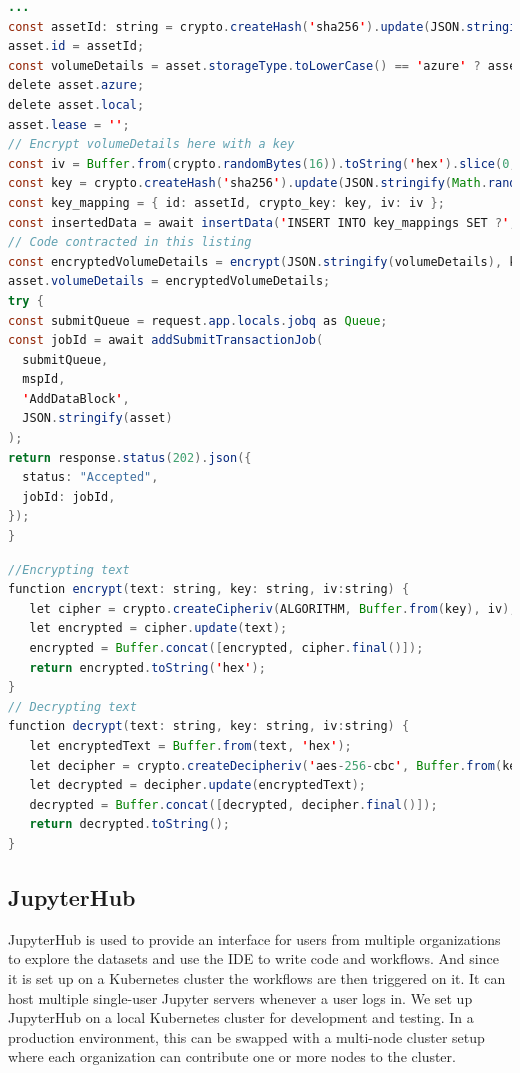 \begin{lstlisting}[language=java, caption={Endpoint to create a block in the chain}]
...
const assetId: string = crypto.createHash('sha256').update(JSON.stringify(asset)).digest('hex');
asset.id = assetId;
const volumeDetails = asset.storageType.toLowerCase() == 'azure' ? asset.azure : asset.local;
delete asset.azure;
delete asset.local;
asset.lease = '';
// Encrypt volumeDetails here with a key
const iv = Buffer.from(crypto.randomBytes(16)).toString('hex').slice(0, 16);
const key = crypto.createHash('sha256').update(JSON.stringify(Math.random())).digest('hex').slice(0, 32);
const key_mapping = { id: assetId, crypto_key: key, iv: iv };
const insertedData = await insertData('INSERT INTO key_mappings SET ?', key_mapping);
// Code contracted in this listing
const encryptedVolumeDetails = encrypt(JSON.stringify(volumeDetails), key, iv);
asset.volumeDetails = encryptedVolumeDetails;
try {
const submitQueue = request.app.locals.jobq as Queue;
const jobId = await addSubmitTransactionJob(
  submitQueue,
  mspId,
  'AddDataBlock',
  JSON.stringify(asset)
);
return response.status(202).json({
  status: "Accepted",
  jobId: jobId,
});
}
\end{lstlisting}
\begin{lstlisting}[language=java, caption={Functions used for encrypting and decypting text}]
//Encrypting text
function encrypt(text: string, key: string, iv:string) {
   let cipher = crypto.createCipheriv(ALGORITHM, Buffer.from(key), iv);
   let encrypted = cipher.update(text);
   encrypted = Buffer.concat([encrypted, cipher.final()]);
   return encrypted.toString('hex');
}
// Decrypting text
function decrypt(text: string, key: string, iv:string) {
   let encryptedText = Buffer.from(text, 'hex');
   let decipher = crypto.createDecipheriv('aes-256-cbc', Buffer.from(key), iv);
   let decrypted = decipher.update(encryptedText);
   decrypted = Buffer.concat([decrypted, decipher.final()]);
   return decrypted.toString();
}
\end{lstlisting}

\subsection{JupyterHub}
JupyterHub is used to provide an interface for users from multiple organizations to explore the datasets and use the IDE to write code and workflows. And since it is set up on a Kubernetes cluster the workflows are then triggered on it. It can host multiple single-user Jupyter servers whenever a user logs in. We set up JupyterHub on a local Kubernetes cluster for development and testing. In a production environment, this can be swapped with a multi-node cluster setup where each organization can contribute one or more nodes to the cluster.

